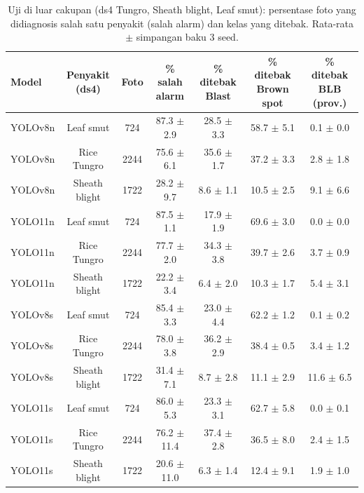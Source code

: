 \begin{table}[!t]
\centering
\caption{Uji di luar cakupan (ds4 Tungro, Sheath blight, Leaf smut): persentase foto yang didiagnosis salah satu penyakit (salah alarm) dan kelas yang ditebak. Rata-rata $\pm$ simpangan baku 3 seed.}
\label{tab:luar_cakupan}
\footnotesize
\begin{tabular}{lcccccc}
\hline
\textbf{Model} & \textbf{Penyakit (ds4)} & \textbf{Foto} & \textbf{\% salah alarm} & \textbf{\% ditebak Blast} & \textbf{\% ditebak Brown spot} & \textbf{\% ditebak BLB (prov.)} \\
\hline
YOLOv8n & Leaf smut & 724 & 87.3 $\pm$ 2.9 & 28.5 $\pm$ 3.3 & 58.7 $\pm$ 5.1 & 0.1 $\pm$ 0.0 \\
YOLOv8n & Rice Tungro & 2244 & 75.6 $\pm$ 6.1 & 35.6 $\pm$ 1.7 & 37.2 $\pm$ 3.3 & 2.8 $\pm$ 1.8 \\
YOLOv8n & Sheath blight & 1722 & 28.2 $\pm$ 9.7 & 8.6 $\pm$ 1.1 & 10.5 $\pm$ 2.5 & 9.1 $\pm$ 6.6 \\
YOLO11n & Leaf smut & 724 & 87.5 $\pm$ 1.1 & 17.9 $\pm$ 1.9 & 69.6 $\pm$ 3.0 & 0.0 $\pm$ 0.0 \\
YOLO11n & Rice Tungro & 2244 & 77.7 $\pm$ 2.0 & 34.3 $\pm$ 3.8 & 39.7 $\pm$ 2.6 & 3.7 $\pm$ 0.9 \\
YOLO11n & Sheath blight & 1722 & 22.2 $\pm$ 3.4 & 6.4 $\pm$ 2.0 & 10.3 $\pm$ 1.7 & 5.4 $\pm$ 3.1 \\
YOLOv8s & Leaf smut & 724 & 85.4 $\pm$ 3.3 & 23.0 $\pm$ 4.4 & 62.2 $\pm$ 1.2 & 0.1 $\pm$ 0.2 \\
YOLOv8s & Rice Tungro & 2244 & 78.0 $\pm$ 3.8 & 36.2 $\pm$ 2.9 & 38.4 $\pm$ 0.5 & 3.4 $\pm$ 1.2 \\
YOLOv8s & Sheath blight & 1722 & 31.4 $\pm$ 7.1 & 8.7 $\pm$ 2.8 & 11.1 $\pm$ 2.9 & 11.6 $\pm$ 6.5 \\
YOLO11s & Leaf smut & 724 & 86.0 $\pm$ 5.3 & 23.3 $\pm$ 3.1 & 62.7 $\pm$ 5.8 & 0.0 $\pm$ 0.1 \\
YOLO11s & Rice Tungro & 2244 & 76.2 $\pm$ 11.4 & 37.4 $\pm$ 2.8 & 36.5 $\pm$ 8.0 & 2.4 $\pm$ 1.5 \\
YOLO11s & Sheath blight & 1722 & 20.6 $\pm$ 11.0 & 6.3 $\pm$ 1.4 & 12.4 $\pm$ 9.1 & 1.9 $\pm$ 1.0 \\
\hline
\end{tabular}
\end{table}
